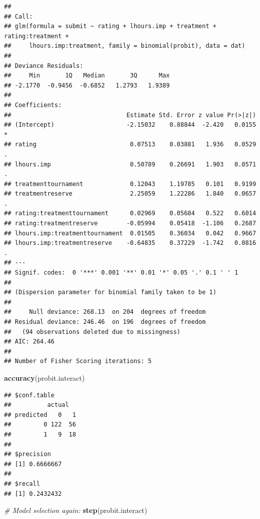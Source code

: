 \documentclass[]{article}
\newenvironment{Shaded}{\begin{snugshade}}{\end{snugshade}}
\newcommand{\KeywordTok}[1]{\textcolor[rgb]{0.13,0.29,0.53}{\textbf{#1}}}
\newcommand{\CommentTok}[1]{\textcolor[rgb]{0.56,0.35,0.01}{\textit{#1}}}
\newcommand{\NormalTok}[1]{#1}
\let\oldShaded\Shaded
\let\endoldShaded\endShaded
\renewenvironment{Shaded}{\footnotesize\oldShaded}{\endoldShaded}
\begin{document}
\begin{verbatim}
## 
## Call:
## glm(formula = submit ~ rating + lhours.imp + treatment + rating:treatment + 
##     lhours.imp:treatment, family = binomial(probit), data = dat)
## 
## Deviance Residuals: 
##     Min       1Q   Median       3Q      Max  
## -2.1770  -0.9456  -0.6852   1.2793   1.9389  
## 
## Coefficients:
##                                Estimate Std. Error z value Pr(>|z|)  
## (Intercept)                    -2.15032    0.88844  -2.420   0.0155 *
## rating                          0.07513    0.03881   1.936   0.0529 .
## lhours.imp                      0.50789    0.26691   1.903   0.0571 .
## treatmenttournament             0.12043    1.19785   0.101   0.9199  
## treatmentreserve                2.25059    1.22286   1.840   0.0657 .
## rating:treatmenttournament      0.02969    0.05684   0.522   0.6014  
## rating:treatmentreserve        -0.05994    0.05418  -1.106   0.2687  
## lhours.imp:treatmenttournament  0.01505    0.36034   0.042   0.9667  
## lhours.imp:treatmentreserve    -0.64835    0.37229  -1.742   0.0816 .
## ---
## Signif. codes:  0 '***' 0.001 '**' 0.01 '*' 0.05 '.' 0.1 ' ' 1
## 
## (Dispersion parameter for binomial family taken to be 1)
## 
##     Null deviance: 268.13  on 204  degrees of freedom
## Residual deviance: 246.46  on 196  degrees of freedom
##   (94 observations deleted due to missingness)
## AIC: 264.46
## 
## Number of Fisher Scoring iterations: 5
\end{verbatim}

\begin{Shaded}
\begin{Highlighting}[]
\KeywordTok{accuracy}\NormalTok{(probit.interact)}
\end{Highlighting}
\end{Shaded}

\begin{verbatim}
## $conf.table
##          actual
## predicted   0   1
##         0 122  56
##         1   9  18
## 
## $precision
## [1] 0.6666667
## 
## $recall
## [1] 0.2432432
\end{verbatim}

\begin{Shaded}
\begin{Highlighting}[]
\CommentTok{# Model selection again:}
\KeywordTok{step}\NormalTok{(probit.interact)}
\end{Highlighting}
\end{Shaded}
\end{document}
